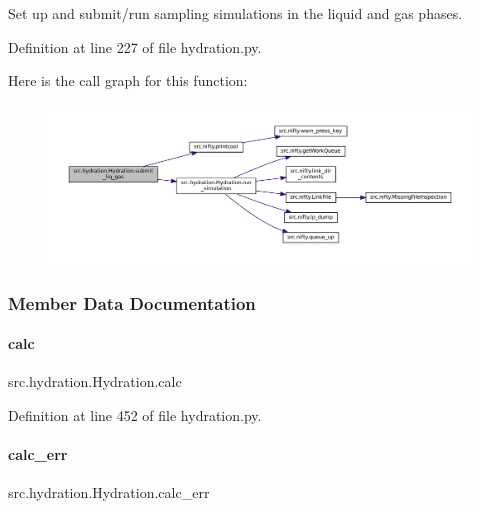 Set up and submit/run sampling simulations in the liquid and gas phases. 



Definition at line 227 of file hydration.\+py.

Here is the call graph for this function\+:
\nopagebreak
\begin{figure}[H]
\begin{center}
\leavevmode
\includegraphics[width=350pt]{classsrc_1_1hydration_1_1Hydration_a7eb7a345cb235a28828b51fc092902c2_cgraph}
\end{center}
\end{figure}


\subsubsection{Member Data Documentation}
\mbox{\label{classsrc_1_1hydration_1_1Hydration_a094fd3625680a572a4de38011818eefb}} 
\paragraph{\texorpdfstring{calc}{calc}}
{\footnotesize\ttfamily src.\+hydration.\+Hydration.\+calc}



Definition at line 452 of file hydration.\+py.

\mbox{\label{classsrc_1_1hydration_1_1Hydration_a3e5f36ed28f145dc611c3b156942c144}} 
\paragraph{\texorpdfstring{calc\+\_\+err}{calc\_err}}
{\footnotesize\ttfamily src.\+hydration.\+Hydration.\+calc\+\_\+err}



